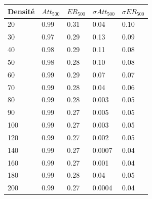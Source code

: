 \documentclass[10pt]{report}
\begin{document}
\begin{figure}[H]
\begin{minipage}[b]{0.5\textwidth} \begin{flushleft}
\centering
\begin{tabular}{|l|l|l|l|l|} \hline
  	Densité & $Att_{500}$ & $ER_{500}$ & $\sigma Att_{500}$ & $\sigma ER_{500}$\\ \hline
	20 & 0.99 & 0.31 & 0.04 & 0.10 \\ \hline
  	30 & 0.97 & 0.29 & 0.13 & 0.09 \\ \hline
  	40 & 0.98 & 0.29 & 0.11 & 0.08 \\ \hline
  	50 & 0.98 & 0.28 & 0.10 & 0.08 \\ \hline
  	60 & 0.99 & 0.29 & 0.07 & 0.07 \\ \hline
  	70 & 0.99 & 0.28 & 0.04 & 0.06 \\ \hline
    80 & 0.99 & 0.28 & 0.003 & 0.05 \\ \hline %
  	90 & 0.99 & 0.27 & 0.005 & 0.05 \\ \hline
  	100 & 0.99 & 0.27 & 0.003 & 0.05 \\ \hline
  	120 & 0.99 & 0.27 & 0.002 & 0.05 \\ \hline
  	140 & 0.99 & 0.27 & 0.0007 & 0.04 \\ \hline
  	160 & 0.99 & 0.27 & 0.001 & 0.04 \\ \hline
  	180 & 0.99 & 0.28 & 0.04 & 0.05 \\ \hline
  	200 & 0.99 & 0.27 & 0.0004 & 0.04 \\ \hline
\end{tabular}
\end{flushleft}\end{minipage}
%
\begin{minipage}{0.5\textwidth} \begin{flushright}
\vspace{-7cm}
\centering
{}
\end{flushright}
\end{minipage}
\end{figure}
\end{document}
